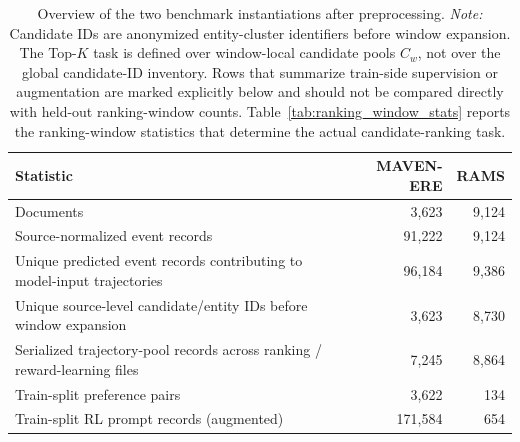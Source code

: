 \documentclass{article}
\begin{document}
\begin{table}[t]
\centering
\caption{Overview of the two benchmark instantiations after preprocessing.
\textit{Note:} Candidate IDs are anonymized entity-cluster identifiers before window expansion.
The Top-$K$ task is defined over window-local candidate pools $C_w$, not over the global candidate-ID inventory.
Rows that summarize train-side supervision or augmentation are marked explicitly below and should not be compared directly with held-out ranking-window counts.
Table~\ref{tab:ranking_window_stats} reports the ranking-window statistics that determine the actual candidate-ranking task.}
\label{tab:dataset_overview}
\small
\setlength{\tabcolsep}{4pt}
\begin{tabularx}{\linewidth}{Yrr}
\hline
Statistic & MAVEN-ERE & RAMS \\
\hline
Documents & 3{,}623 & 9{,}124 \\
Source-normalized event records & 91{,}222 & 9{,}124 \\
Unique predicted event records contributing to model-input trajectories & 96{,}184 & 9{,}386 \\
Unique source-level candidate/entity IDs before window expansion & 3{,}623 & 8{,}730 \\
Serialized trajectory-pool records across ranking / reward-learning files & 7{,}245 & 8{,}864 \\
Train-split preference pairs & 3{,}622 & 134 \\
Train-split RL prompt records (augmented) & 171{,}584 & 654 \\
\hline
\end{tabularx}
\end{table}
\end{document}
